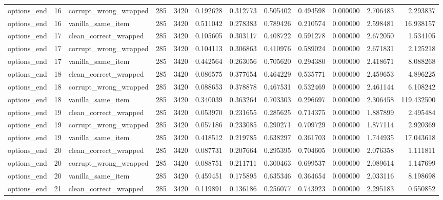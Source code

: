 \begin{tabular}{lrlrrrrrrrrr}
options\_end & 16 & corrupt\_wrong\_wrapped & 285 & 3420 & 0.192628 & 0.312773 & 0.505402 & 0.494598 & 0.000000 & 2.706483 & 2.293837 \\
options\_end & 16 & vanilla\_same\_item & 285 & 3420 & 0.511042 & 0.278383 & 0.789426 & 0.210574 & 0.000000 & 2.598481 & 16.938157 \\
options\_end & 17 & clean\_correct\_wrapped & 285 & 3420 & 0.105605 & 0.303117 & 0.408722 & 0.591278 & 0.000000 & 2.672050 & 1.534105 \\
options\_end & 17 & corrupt\_wrong\_wrapped & 285 & 3420 & 0.104113 & 0.306863 & 0.410976 & 0.589024 & 0.000000 & 2.671831 & 2.125218 \\
options\_end & 17 & vanilla\_same\_item & 285 & 3420 & 0.442564 & 0.263056 & 0.705620 & 0.294380 & 0.000000 & 2.418671 & 8.088268 \\
options\_end & 18 & clean\_correct\_wrapped & 285 & 3420 & 0.086575 & 0.377654 & 0.464229 & 0.535771 & 0.000000 & 2.459653 & 4.896225 \\
options\_end & 18 & corrupt\_wrong\_wrapped & 285 & 3420 & 0.088653 & 0.378878 & 0.467531 & 0.532469 & 0.000000 & 2.461144 & 6.108242 \\
options\_end & 18 & vanilla\_same\_item & 285 & 3420 & 0.340039 & 0.363264 & 0.703303 & 0.296697 & 0.000000 & 2.306458 & 119.432500 \\
options\_end & 19 & clean\_correct\_wrapped & 285 & 3420 & 0.053970 & 0.231655 & 0.285625 & 0.714375 & 0.000000 & 1.887899 & 2.495484 \\
options\_end & 19 & corrupt\_wrong\_wrapped & 285 & 3420 & 0.057186 & 0.233085 & 0.290271 & 0.709729 & 0.000000 & 1.877114 & 2.920369 \\
options\_end & 19 & vanilla\_same\_item & 285 & 3420 & 0.418512 & 0.219785 & 0.638297 & 0.361703 & 0.000000 & 1.744935 & 17.043618 \\
options\_end & 20 & clean\_correct\_wrapped & 285 & 3420 & 0.087731 & 0.207664 & 0.295395 & 0.704605 & 0.000000 & 2.076358 & 1.111811 \\
options\_end & 20 & corrupt\_wrong\_wrapped & 285 & 3420 & 0.088751 & 0.211711 & 0.300463 & 0.699537 & 0.000000 & 2.089614 & 1.147699 \\
options\_end & 20 & vanilla\_same\_item & 285 & 3420 & 0.459451 & 0.175895 & 0.635346 & 0.364654 & 0.000000 & 2.033116 & 8.198698 \\
options\_end & 21 & clean\_correct\_wrapped & 285 & 3420 & 0.119891 & 0.136186 & 0.256077 & 0.743923 & 0.000000 & 2.295183 & 0.550852 \\

\end{tabular}
